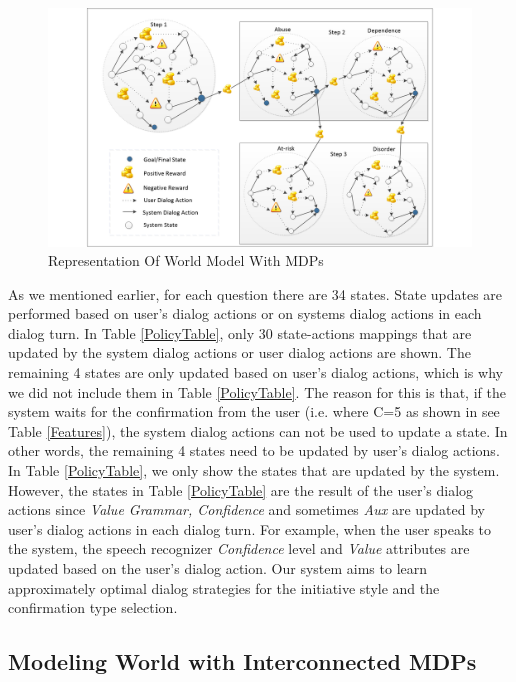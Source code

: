 \begin{sloppy}
\begin{figure}[t]
  \centering    
	\includegraphics[scale=0.37]{img/5MDPV2.png}
	\caption{Representation Of World Model With MDPs}
  \label{5mdp}
\end{figure}



As we mentioned earlier, for each question there are 34 states. State updates are performed based on user's dialog actions or on systems dialog actions in each dialog turn. In Table \ref{PolicyTable}, only 30 state-actions mappings that are updated by the system dialog actions or user dialog actions are shown. The remaining 4 states are only updated based on user's dialog actions, which is why we did not include them in Table \ref{PolicyTable}. The reason for this is that, if the system waits for the confirmation from the user (i.e. where C=5 as shown in see Table \ref{Features}), the system dialog actions can not be used to update a state. In other words, the remaining 4 states need to be updated by user's dialog actions. In Table \ref{PolicyTable}, we only show the states that are updated by the system. However, the states in Table \ref{PolicyTable} are the result of the user's dialog actions since \textit{Value Grammar, Confidence} and sometimes \textit{Aux} are updated by user's dialog actions in each dialog turn. For example, when the user speaks to the system, the speech recognizer \textit{Confidence} level and \textit{Value} attributes are updated based on the user's dialog action. Our system aims to learn approximately optimal dialog strategies for the initiative style and the confirmation type selection.

\subsection{Modeling World with Interconnected MDPs}


\end{sloppy}
